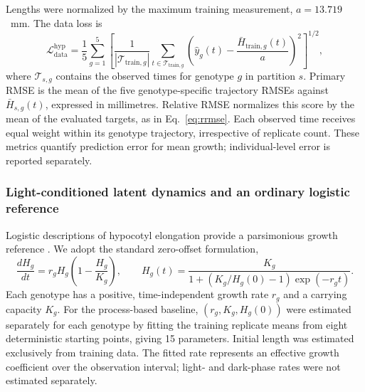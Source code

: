 \documentclass[preprint,12pt,authoryear]{elsarticle}
\begin{document}
Lengths were normalized by the maximum training measurement, $a=13.719$~mm. The data loss is
\begin{equation}
 \mathcal L_{\mathrm{data}}^{\mathrm{hyp}}
 =\frac{1}{5}\sum_{g=1}^{5}\left[
 \frac{1}{|\mathcal T_{\mathrm{train},g}|}
 \sum_{t\in\mathcal T_{\mathrm{train},g}}
 \left(\hat y_g(t)-\frac{\bar H_{\mathrm{train},g}(t)}{a}\right)^2
 \right]^{1/2},
 \label{eq:hypocotyl_data_loss}
\end{equation}
where $\mathcal T_{s,g}$ contains the observed times for genotype $g$ in partition $s$. Primary RMSE is the mean of the five genotype-specific trajectory RMSEs against $\bar H_{s,g}(t)$, expressed in millimetres. Relative RMSE normalizes this score by the mean of the evaluated targets, as in Eq.~\eqref{eq:rrmse}. Each observed time receives equal weight within its genotype trajectory, irrespective of replicate count. These metrics quantify prediction error for mean growth; individual-level error is reported separately.

\subsubsection{Light-conditioned latent dynamics and an ordinary logistic reference}
\label{subsec:lightmodel}

Logistic descriptions of hypocotyl elongation provide a parsimonious growth reference \citep{alimchandani2026atlas}. We adopt the standard zero-offset formulation,
\begin{equation}
 \frac{dH_g}{dt}=r_g H_g\left(1-\frac{H_g}{K_g}\right),
 \qquad
 H_g(t)=\frac{K_g}{1+(K_g/H_g(0)-1)\exp(-r_g t)}.
 \label{eq:hypocotyl_logistic}
\end{equation}
Each genotype has a positive, time-independent growth rate $r_g$ and a carrying capacity $K_g$. For the process-based baseline, $(r_g,K_g,H_g(0))$ were estimated separately for each genotype by fitting the training replicate means from eight deterministic starting points, giving 15 parameters. Initial length was estimated exclusively from training data. The fitted rate represents an effective growth coefficient over the observation interval; light- and dark-phase rates were not estimated separately.
\end{document}
